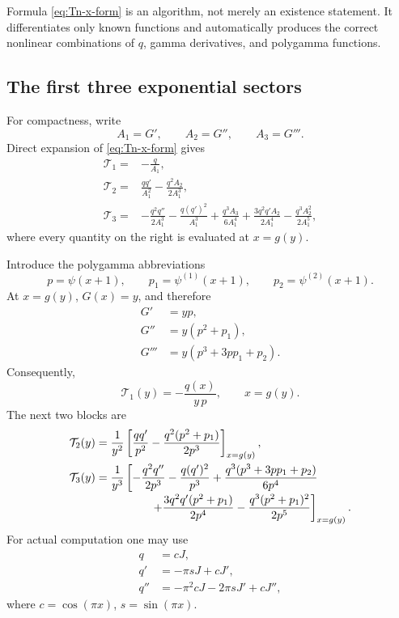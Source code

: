 \documentclass[11pt,oneside]{article}
\theoremstyle{plain}
\theoremstyle{definition}
\theoremstyle{remark}
\newcommand{\Tcal}{\mathcal{T}}
\begin{document}
Formula \eqref{eq:Tn-x-form} is an algorithm, not merely an existence
statement.  It differentiates only known functions and automatically produces
the correct nonlinear combinations of \(q\), gamma derivatives, and
polygamma functions.

\subsection{The first three exponential sectors}

For compactness, write
\begin{equation}
 A_1=G',\qquad A_2=G'',\qquad A_3=G'''.
 \label{eq:A123}
\end{equation}
Direct expansion of \eqref{eq:Tn-x-form} gives
\begin{align}
 \Tcal_1={}&-\frac{q}{A_1},
 \label{eq:T1-general}\\
 \Tcal_2={}&\frac{qq'}{A_1^2}-\frac{q^2A_2}{2A_1^3},
 \label{eq:T2-general}\\
 \Tcal_3={}&-\frac{q^2q''}{2A_1^3}
 -\frac{q(q')^2}{A_1^3}
 +\frac{q^3A_3}{6A_1^4}
 +\frac{3q^2q'A_2}{2A_1^4}
 -\frac{q^3A_2^2}{2A_1^5},
 \label{eq:T3-general}
\end{align}
where every quantity on the right is evaluated at \(x=g(y)\).

Introduce the polygamma abbreviations
\begin{equation}
 p=\psi(x+1),\qquad
 p_1=\psi^{(1)}(x+1),\qquad
 p_2=\psi^{(2)}(x+1).
 \label{eq:p-polygamma}
\end{equation}
At \(x=g(y)\), \(G(x)=y\), and therefore
\begin{align}
 G'&=yp,
 \label{eq:G1-poly}\\
 G''&=y(p^2+p_1),
 \label{eq:G2-poly}\\
 G'''&=y(p^3+3pp_1+p_2).
 \label{eq:G3-poly}
\end{align}
Consequently,
\begin{equation}
 \boxed{\quad \Tcal_1(y)=-\frac{q(x)}{y\,p},\qquad x=g(y).\quad}
 \label{eq:T1-polygamma}
\end{equation}
The next two blocks are
\begin{align}
 \Tcal_2(y)
 ={}&\frac1{y^2}\left[
 \frac{qq'}{p^2}
 -\frac{q^2(p^2+p_1)}{2p^3}
 \right]_{x=g(y)},
 \label{eq:T2-polygamma}\\
 \Tcal_3(y)
 ={}&\frac1{y^3}\left[
 -\frac{q^2q''}{2p^3}-\frac{q(q')^2}{p^3}
 +\frac{q^3(p^3+3pp_1+p_2)}{6p^4}
 \right.\notag\\[-0.2em]
 &\left.\hspace{3.5em}
 +\frac{3q^2q'(p^2+p_1)}{2p^4}
 -\frac{q^3(p^2+p_1)^2}{2p^5}
 \right]_{x=g(y)}.
 \label{eq:T3-polygamma}
\end{align}
For actual computation one may use
\begin{align}
 q&=cJ,
 \label{eq:q-cJ}\\
 q'&=-\pi sJ+cJ',
 \label{eq:qp-cJ}\\
 q''&=-\pi^2cJ-2\pi sJ'+cJ'',
 \label{eq:qpp-cJ}
\end{align}
where \(c=\cos(\pi x)\), \(s=\sin(\pi x)\).
\end{document}
